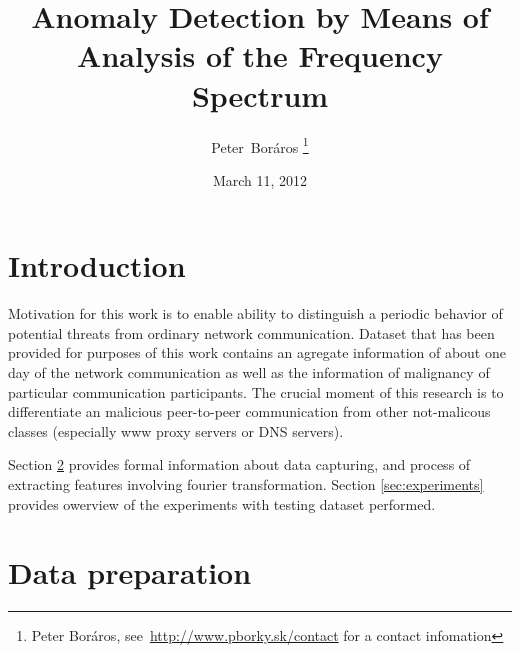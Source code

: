 \documentclass[a4paper,journal]{IEEEtran}
\begin{document}
\title{Anomaly Detection by Means of Analysis of the Frequency Spectrum}
\date{March 11, 2012}
\author{Peter~Boráros %
\thanks{{Peter Boráros}, see~{\scriptsize\url{http://www.pborky.sk/contact}} for a contact infomation}}%



\maketitle
\IEEEdisplaynotcompsoctitleabstractindextext
\IEEEpeerreviewmaketitle

\section{Introduction}\label{intro}
Motivation for this work is to enable ability to distinguish a periodic behavior of potential threats from ordinary
network communication. Dataset that has been provided for purposes of this work contains an agregate information of 
about one day of the network communication as well as the information of malignancy of particular communication 
participants. The crucial moment of this research is to differentiate an malicious peer-to-peer communication from
other not-malicous classes (especially www proxy servers or DNS servers).

Section \ref{sec:prep} provides formal information about data capturing, and process of extracting features involving 
fourier transformation. Section \ref{sec:experiments} provides owerview of the experiments with testing dataset performed.

\section{Data preparation}\label{sec:prep}
\end{document}

